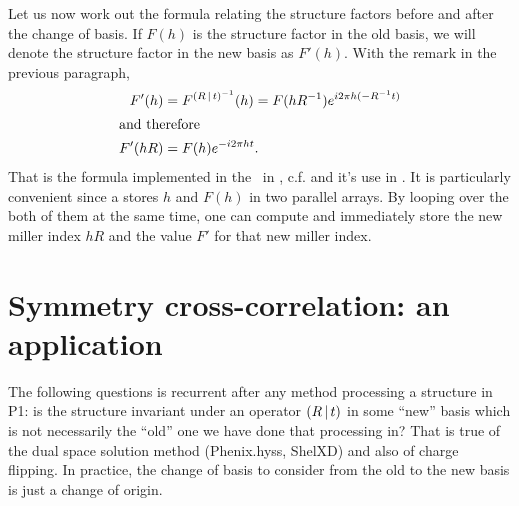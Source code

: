 \documentclass[11pt]{article}
\begin{document}
Let us now work out the formula relating the structure factors before and after the change of basis. If $F(h)$ is the structure factor in the old basis, we will denote the structure factor in the new basis as $F'(h)$. With the remark in the previous paragraph,
\begin{align}
F'(h) &= F^{\left( R\,\vert\, t \right)^{-1}}(h) = F(hR^{-1}) e^{i2\pi h(-R^{-1}t)}\nonumber\\
\intertext{and therefore}
F'(hR) &= F(h)e^{-i2\pi ht}.
\end{align}
That is the formula implemented in the \cctbx\ in , c.f.  and it's use in . It is particularly convenient since a  stores $h$ and $F(h)$ in two parallel arrays. By looping over the both of them at the same time, one can compute and immediately store the new miller index $hR$ and the value $F'$ for that new miller index.

\section{Symmetry cross-correlation: an application}

The following questions is recurrent after any method processing a structure in P1: is the structure invariant under an operator $\left( R\,\vert\, t \right)$ in some ``new'' basis which is not necessarily the ``old'' one we have done that processing in? That is true of the dual space solution method (Phenix.hyss, ShelXD) and also of charge flipping. In practice, the change of basis to consider from the old to the new basis is just a change of origin.
\end{document}
